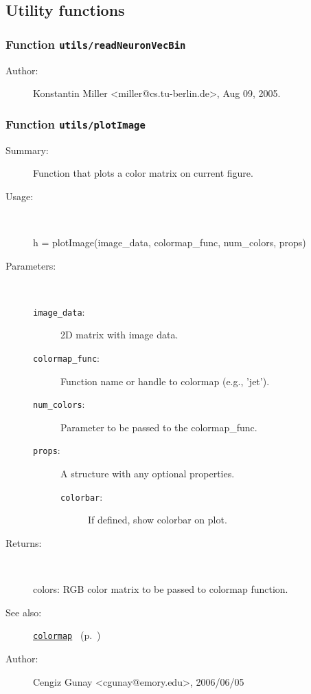 \subsection{Utility functions}%
\label{ref_utils}%
\hypertarget{ref_utils}{}%
\subsubsection[Function \texttt{readNeuronVecBin}]{Function \texttt{utils/readNeuronVecBin}}%
%
\label{ref_utils__readNeuronVecBin}%
\hypertarget{ref_utils__readNeuronVecBin}{}%
\begin{description}
%
%
%
%
%
%
%
\item[Author:]%
Konstantin Miller <miller@cs.tu-berlin.de>, Aug 09, 2005.%
\end{description}
\methodline%
\subsubsection[Function \texttt{plotImage}]{Function \texttt{utils/plotImage}}%
%
\label{ref_utils__plotImage}%
\hypertarget{ref_utils__plotImage}{}%
\begin{description}
\item[Summary:]Function that plots a color matrix on current figure.
%
\item[Usage:]~%
\begin{lyxcode}%
h = plotImage(image\_data, colormap\_func, num\_colors, props)
%
\end{lyxcode}%
%
%
\item[Parameters:]~
\begin{description}%
\item[\texttt{image\_data}:]
 2D matrix with image data.
\item[\texttt{colormap\_func}:]
 Function name or handle to colormap (e.g., 'jet').
\item[\texttt{num\_colors}:]
 Parameter to be passed to the colormap\_func.
\item[\texttt{props}:]
 A structure with any optional properties.
\begin{description}%
\item[\texttt{colorbar}:]
 If defined, show colorbar on plot.
\end{description}%
\end{description}%
%
\item[Returns:]~

	colors: RGB color matrix to be passed to colormap function.
%
%
\item[See also:]%
\hyperlink{ref_colormap}{\texttt{colormap}}%
\ (p.~\pageref{ref_colormap})%
%
%
\item[Author:]%
Cengiz Gunay <cgunay@emory.edu>, 2006/06/05%
\end{description}
\methodline%
